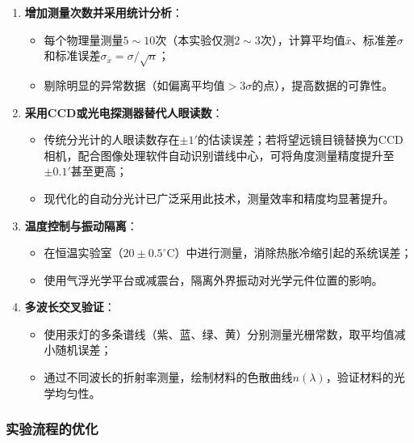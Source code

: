 \documentclass[11pt]{article}
\begin{document}
\begin{enumerate}
    \item \textbf{增加测量次数并采用统计分析}：
    \begin{itemize}
        \item 每个物理量测量$5 \sim 10$次（本实验仅测$2 \sim 3$次），计算平均值$\bar{x}$、标准差$\sigma$和标准误差$\sigma_{\bar{x}} = \sigma / \sqrt{n}$；
        \item 剔除明显的异常数据（如偏离平均值$> 3\sigma$的点），提高数据的可靠性。
    \end{itemize}
    
    \item \textbf{采用CCD或光电探测器替代人眼读数}：
    \begin{itemize}
        \item 传统分光计的人眼读数存在$\pm 1'$的估读误差；若将望远镜目镜替换为CCD相机，配合图像处理软件自动识别谱线中心，可将角度测量精度提升至$\pm 0.1'$甚至更高；
        \item 现代化的自动分光计已广泛采用此技术，测量效率和精度均显著提升。
    \end{itemize}
    
    \item \textbf{温度控制与振动隔离}：
    \begin{itemize}
        \item 在恒温实验室（$20 \pm 0.5^\circ\text{C}$）中进行测量，消除热胀冷缩引起的系统误差；
        \item 使用气浮光学平台或减震台，隔离外界振动对光学元件位置的影响。
    \end{itemize}
    
    \item \textbf{多波长交叉验证}：
    \begin{itemize}
        \item 使用汞灯的多条谱线（紫、蓝、绿、黄）分别测量光栅常数，取平均值减小随机误差；
        \item 通过不同波长的折射率测量，绘制材料的色散曲线$n(\lambda)$，验证材料的光学均匀性。
    \end{itemize}
\end{enumerate}

\subsubsection{实验流程的优化}
\end{document}
